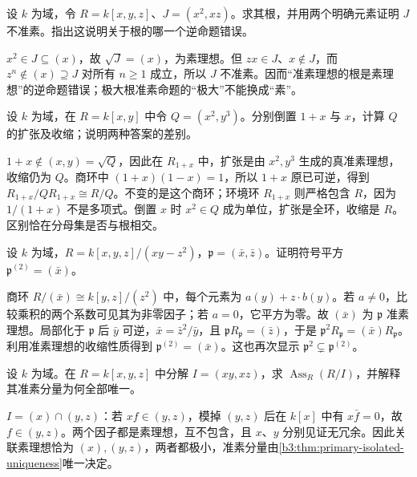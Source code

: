 \begin{exercise}\label{b3:ex:04-prime-radical-insufficient}
	设 \(k\) 为域，令 \(R=k[x,y,z]\)、\(J=(x^2,xz)\)。求其根，并用两个明确元素证明 \(J\) 不准素。指出这说明关于根的哪一个逆命题错误。
\end{exercise}
\begin{solution}
	\(x^2\in J\subseteq(x)\)，故 \(\sqrt J=(x)\)，为素理想。但 \(zx\in J\)、\(x\notin J\)，而 \(z^n\notin(x)\supseteq J\) 对所有 \(n\ge1\) 成立，所以 \(J\) 不准素。因而“准素理想的根是素理想”的逆命题错误；极大根准素命题的“极大”不能换成“素”。
\end{solution}

\begin{exercise}\label{b3:ex:04-primary-localization-calculation}
	设 \(k\) 为域，在 \(R=k[x,y]\) 中令 \(Q=(x^2,y^3)\)。分别倒置 \(1+x\) 与 \(x\)，计算 \(Q\) 的扩张及收缩；说明两种答案的差别。
\end{exercise}
\begin{solution}
	\(1+x\notin(x,y)=\sqrt Q\)，因此在 \(R_{1+x}\) 中，扩张是由 \(x^2,y^3\) 生成的真准素理想，收缩仍为 \(Q\)。商环中 \((1+x)(1-x)=1\)，所以 \(1+x\) 原已可逆，得到 \(R_{1+x}/QR_{1+x}\cong R/Q\)。不变的是这个商环；环境环 \(R_{1+x}\) 则严格包含 \(R\)，因为 \(1/(1+x)\) 不是多项式。倒置 \(x\) 时 \(x^2\in Q\) 成为单位，扩张是全环，收缩是 \(R\)。区别恰在分母集是否与根相交。
\end{solution}

\begin{exercise}\label{b3:ex:04-symbolic-square-cone}
	设 \(k\) 为域，\(R=k[x,y,z]/(xy-z^2)\)，\(\mathfrak p=(\bar x,\bar z)\)。证明符号平方 \(\mathfrak p^{(2)}=(\bar x)\)。
\end{exercise}
\begin{solution}
	商环 \(R/(\bar x)\cong k[y,z]/(z^2)\) 中，每个元素为 \(a(y)+z\cdot b(y)\)。若 \(a\ne0\)，比较乘积的两个系数可见其为非零因子；若 \(a=0\)，它平方为零。故 \((\bar x)\) 为 \(\mathfrak p\) 准素理想。局部化于 \(\mathfrak p\) 后 \(\bar y\) 可逆，\(\bar x=\bar z^2/\bar y\)，且 \(\mathfrak pR_{\mathfrak p}=(\bar z)\)，于是 \(\mathfrak p^2R_{\mathfrak p}=(\bar x)R_{\mathfrak p}\)。利用准素理想的收缩性质得到 \(\mathfrak p^{(2)}=(\bar x)\)。这也再次显示 \(\mathfrak p^2\subsetneq\mathfrak p^{(2)}\)。
\end{solution}

\begin{exercise}\label{b3:ex:04-two-isolated-components}
	设 \(k\) 为域。在 \(R=k[x,y,z]\) 中分解 \(I=(xy,xz)\)，求 \(\operatorname{Ass}_R(R/I)\)，并解释其准素分量为何全部唯一。
\end{exercise}
\begin{solution}
	\(I=(x)\cap(y,z)\)：若 \(xf\in(y,z)\)，模掉 \((y,z)\) 后在 \(k[x]\) 中有 \(x\bar f=0\)，故 \(f\in(y,z)\)。两个因子都是素理想，互不包含，且 \(x\)、\(y\) 分别见证无冗余。因此关联素理想恰为 \((x),(y,z)\)，两者都极小，准素分量由\cref{b3:thm:primary-isolated-uniqueness}唯一决定。
\end{solution}

